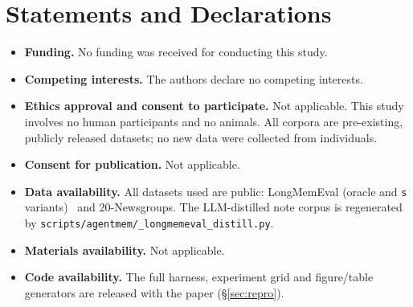 \documentclass[pdflatex,sn-mathphys-num,12pt]{sn-jnl}
\theoremstyle{thmstyleone}%
\theoremstyle{thmstyletwo}%
\theoremstyle{thmstylethree}%
\newcommand{\secref}[1]{\S\ref{#1}}
\begin{document}
\section*{Statements and Declarations}
\begin{itemize}
  \item \textbf{Funding.} No funding was received for conducting this study.
  \item \textbf{Competing interests.} The authors declare no competing interests.
  \item \textbf{Ethics approval and consent to participate.} Not applicable. This study
    involves no human participants and no animals. All corpora are pre-existing, publicly
    released datasets; no new data were collected from individuals.
  \item \textbf{Consent for publication.} Not applicable.
  \item \textbf{Data availability.} All datasets used are public: LongMemEval
    (oracle and \texttt{s} variants)~\cite{wu2024longmemeval} and 20-Newsgroups. The
    LLM-distilled note corpus is regenerated by
    \texttt{scripts/agentmem/\allowbreak\_longmemeval\_distill.py}.
  \item \textbf{Materials availability.} Not applicable.
  \item \textbf{Code availability.} The full harness, experiment grid and figure/table
    generators are released with the paper (\secref{sec:repro}).
\end{itemize}


\end{document}
